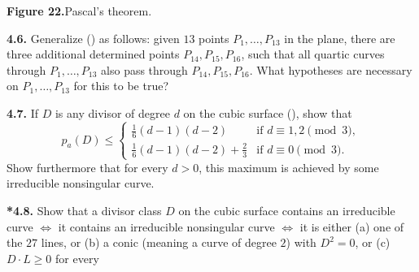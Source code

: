 {{\centering
\hypertarget{fig-book-22}{}%
\par
\smallskip
\small\textbf{Figure 22.}\enspace Pascal's theorem.\par
}

\smallskip
\noindent\hypertarget{ex-V-4.6}{}\textbf{4.6.} Generalize () as follows: given $13$ points $P_1,\dots,P_{13}$ in the plane, there are three additional determined points $P_{14},P_{15},P_{16}$, such that all quartic curves through $P_1,\dots,P_{13}$ also pass through $P_{14},P_{15},P_{16}$. What hypotheses are necessary on $P_1,\dots,P_{13}$ for this to be true?

\smallskip
\noindent\hypertarget{ex-V-4.7}{}\textbf{4.7.} If $D$ is any divisor of degree $d$ on the cubic surface (), show that
\[
p_a(D)\le
\begin{cases}
\tfrac16(d-1)(d-2)&\text{if }d\equiv1,2\pmod 3,\\[2pt]
\tfrac16(d-1)(d-2)+\tfrac23&\text{if }d\equiv0\pmod 3.
\end{cases}
\]
Show furthermore that for every $d>0$, this maximum is achieved by some irreducible nonsingular curve.

\smallskip
\noindent\hypertarget{ex-V-4.8}{}\textbf{*4.8.} Show that a divisor class $D$ on the cubic surface contains an irreducible curve $\Leftrightarrow$ it contains an irreducible nonsingular curve $\Leftrightarrow$ it is either (a) one of the $27$ lines, or (b) a conic (meaning a curve of degree $2$) with $D^2=0$, or (c) $D\cdot L\ge0$ for every}
